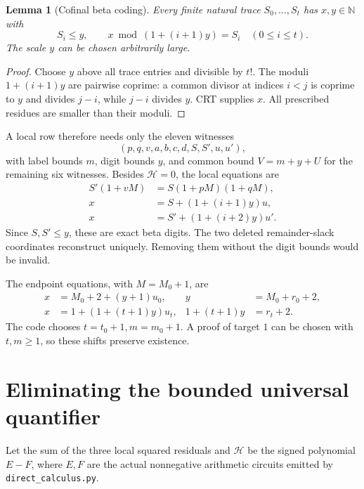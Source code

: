 \documentclass[11pt,letterpaper]{article}
\newcommand{\N}{\mathbb N}
\newtheorem{lemma}[theorem]{Lemma}
\theoremstyle{definition}\newtheorem{definition}[theorem]{Definition}
\theoremstyle{remark}\newtheorem{remark}[theorem]{Remark}
\begin{document}
\begin{lemma}[Cofinal beta coding]\label{lem:beta}
Every finite natural trace $S_0,\ldots,S_t$ has $x,y\in\N$ with
\[
 S_i\le y,\qquad x\bmod(1+(i+1)y)=S_i\quad(0\le i\le t).
\]
The scale $y$ can be chosen arbitrarily large.
\end{lemma}
\begin{proof}
Choose $y$ above all trace entries and divisible by $t!$. The moduli
$1+(i+1)y$ are pairwise coprime: a common divisor at indices $i<j$
is coprime to $y$ and divides $j-i$, while $j-i$ divides $y$.
CRT supplies $x$. All prescribed residues are smaller than their moduli.
\end{proof}

A local row therefore needs only the eleven witnesses
\[
 (p,q,v,a,b,c,d,S,S',u,u'),
\]
with label bounds $m$, digit bounds $y$, and common bound
$V=m+y+U$ for the remaining six witnesses. Besides $\mathscr H=0$,
the local equations are
\begin{align*}
 S'(1+vM)&=S(1+pM)(1+qM),\\
 x&=S+(1+(i+1)y)u,\\
 x&=S'+(1+(i+2)y)u'.
\end{align*}
Since $S,S'\le y$, these are exact beta digits. The two deleted
remainder-slack coordinates reconstruct uniquely. Removing them without
the digit bounds would be invalid.

The endpoint equations, with $M=M_0+1$, are
\begin{align*}
 x&=M_0+2+(y+1)u_0,& y&=M_0+r_0+2,\\
 x&=1+(1+(t+1)y)u_t,& 1+(t+1)y&=r_t+2.
\end{align*}
The code chooses $t=t_0+1,m=m_0+1$. A proof of target $1$ can be
chosen with $t,m\ge1$, so these shifts preserve existence.

\section{Eliminating the bounded universal quantifier}

Let the sum of the three local squared residuals and $\mathscr H$ be
the signed polynomial $E-F$, where $E,F$ are the actual nonnegative
arithmetic circuits emitted by \texttt{direct\_calculus.py}.
\end{document}

